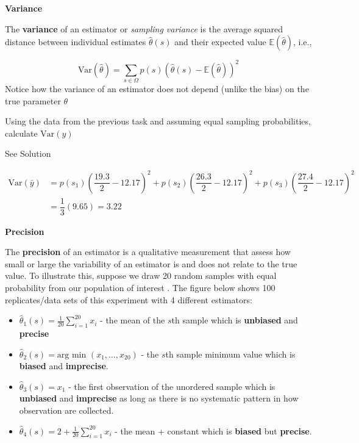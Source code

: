 \documentclass[
  letterpaper,
  DIV=11,
  numbers=noendperiod]{scrartcl}
\begin{document}
\textbf{Variance}

The \textbf{variance} of an estimator or \emph{sampling variance} is the
average squared distance between individual estimates
\(\hat{\theta}(s)\) and their expected value
\(\mathbb{E}(\hat{\theta})\), i.e.,

\[
\text{Var}(\hat{\theta}) = \sum_{s\in \Omega} p(s) \left(\hat{\theta}(s)-\mathbb{E}(\hat{\theta})\right)^2 
\] Notice how the variance of an estimator does not depend (unlike the
bias) on the true parameter \(\theta\)

\begin{tcolorbox}[enhanced jigsaw, title={Task 2}, colback=white, coltitle=black, leftrule=.75mm, rightrule=.15mm, breakable, colbacktitle=quarto-callout-important-color!10!white, toptitle=1mm, colframe=quarto-callout-important-color-frame, opacityback=0, titlerule=0mm, arc=.35mm, opacitybacktitle=0.6, toprule=.15mm, left=2mm, bottomrule=.15mm, bottomtitle=1mm]

Using the data from the previous task and assuming equal sampling
probabilities, calculate \(\text{Var}(\hat{y})\)

See Solution

\[
\begin{aligned}
\text{Var}(\bar{y}) &= p(s_1) \left(\dfrac{19.3}{2} - 12.17\right)^2 +  p(s_2) \left(\dfrac{26.3}{2} - 12.17\right)^2 +  p(s_3) \left(\dfrac{27.4}{2} - 12.17\right)^2\\
&= \dfrac{1}{3}\left(  9.65 \right) =  3.22 
\end{aligned}
\]

\end{tcolorbox}

\textbf{Precision}

The \textbf{precision} of an estimator is a qualitative measurement that
assess how small or large the variability of an estimator is and does
not relate to the true value. To illustrate this, suppose we draw 20
random samples with equal probability from our population of interest .
The figure below shows 100 replicates/data sets of this experiment with
4 different estimators:

\begin{itemize}
\item
  \(\hat{\theta}_{1}(s) =\frac{1}{20}\sum_{i=1}^{20} x_i\) - the mean of
  the \(s\)th sample which is \textbf{unbiased} and \textbf{precise}
\item
  \(\hat{\theta}_{2}(s) = \text{arg min } (x_1,\ldots, x_{20})\) - the
  \(s\)th sample minimum value which is \textbf{biased} and
  \textbf{imprecise}.
\item
  \(\hat{\theta}_{3}(s)  = x_1\) - the first observation of the
  unordered sample which is \textbf{unbiased} and \textbf{imprecise} as
  long as there is no systematic pattern in how observation are
  collected.
\item
  \(\hat{\theta}_{4}(s) =2 + \frac{1}{20}\sum_{i=1}^{20} x_i\) - the
  mean + constant which is \textbf{biased} but \textbf{precise}.
\end{itemize}
\end{document}
